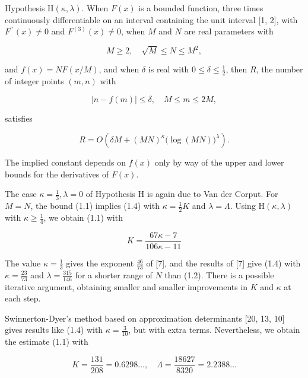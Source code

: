 \documentclass[10pt]{article}
\begin{document}
Hypothesis $\mathrm{H}(\kappa, \lambda)$. When $F(x)$ is a bounded function, three times continuously differentiable on an interval containing the unit interval [1, 2], with $F^{\prime \prime}(x) \neq 0$ and $F^{(3)}(x) \neq 0$, when $M$ and $N$ are real parameters with


\begin{equation*}
M \geqslant 2, \quad \sqrt{M} \leqslant N \leqslant M^{2}, \tag{1.2}
\end{equation*}


and $f(x)=N F(x / M)$, and when $\delta$ is real with $0 \leqslant \delta \leqslant \frac{1}{2}$, then $R$, the number of integer points $(m, n)$ with


\begin{equation*}
|n-f(m)| \leqslant \delta, \quad M \leqslant m \leqslant 2 M, \tag{1.3}
\end{equation*}


satisfies


\begin{equation*}
R=O\left(\delta M+(MN)^{\kappa}\bigl(\log(MN)\bigr)^{\lambda}\right). \tag{1.4}
\end{equation*}


The implied constant depends on $f(x)$ only by way of the upper and lower bounds for the derivatives of $F(x)$.

The case $\kappa=\frac{1}{3}, \lambda=0$ of Hypothesis H is again due to Van der Corput. For $M=N$, the bound (1.1) implies (1.4) with $\kappa=\frac{1}{2} K$ and $\lambda=\Lambda$. Using $\mathrm{H}(\kappa, \lambda)$ with $\kappa \geqslant \frac{1}{4}$, we obtain (1.1) with

$$
K=\frac{67 \kappa-7}{106 \kappa-11}
$$

The value $\kappa=\frac{1}{3}$ gives the exponent $\frac{46}{73}$ of [7], and the results of [7] give (1.4) with $\kappa=\frac{23}{73}$ and $\lambda=\frac{315}{146}$ for a shorter range of $N$ than (1.2). There is a possible iterative argument, obtaining smaller and smaller improvements in $K$ and $\kappa$ at each step.

Swinnerton-Dyer's method based on approximation determinants [20, 13, 10] gives results like (1.4) with $\kappa=\frac{3}{10}$, but with extra terms. Nevertheless, we obtain the estimate (1.1) with

$$
K=\frac{131}{208}=0.6298 \ldots, \quad \Lambda=\frac{18627}{8320}=2.2388 \ldots
$$
\end{document}
